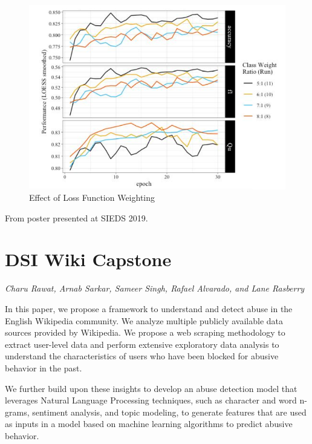 \begin{figure}[!hbtp]
\includegraphics[width=\textwidth]{images/bmc2}
\caption[Loss function analysis]{Effect of Loss Function Weighting}
\end{figure}



From poster presented at SIEDS 2019.

\pagebreak
\section{DSI Wiki Capstone}
\label{sec:wik}

\emph{Charu Rawat, Arnab Sarkar, Sameer Singh, Rafael Alvarado, and Lane Rasberry}
\bigskip

In this paper, we propose a framework to understand and detect abuse in the English Wikipedia community. We analyze multiple publicly available data sources provided by Wikipedia. We propose a web scraping methodology to extract user-level data and perform extensive exploratory data analysis to understand the characteristics of users who have been blocked for abusive behavior in the past.

We further build upon these insights to develop an abuse detection model that leverages Natural Language Processing techniques, such as character and word n-grams, sentiment analysis, and topic modeling, to generate features that are used as inputs in a model based on machine learning algorithms to predict abusive behavior.

